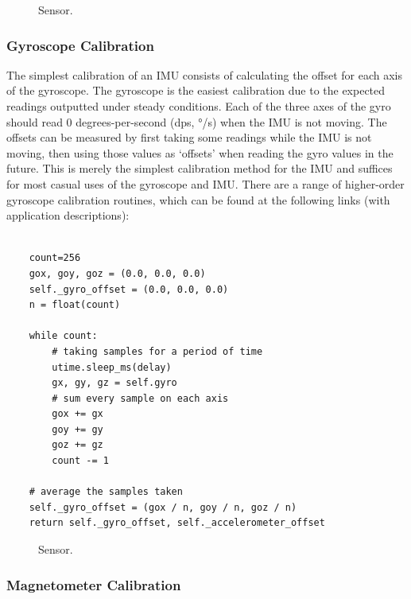 \begin{figure}[!h]
    \centering
    \resizebox{1\linewidth}{!}{}
    \caption{Sensor.}
\end{figure}

\subsubsection{Gyroscope Calibration}

The simplest calibration of an IMU consists of calculating the offset for each axis of the gyroscope. The gyroscope is the easiest calibration due to the expected readings outputted under steady conditions. Each of the three axes of the gyro should read 0 degrees-per-second (dps, °/s) when the IMU is not moving. The offsets can be measured by first taking some readings while the IMU is not moving, then using those values as ‘offsets’ when reading the gyro values in the future. This is merely the simplest calibration method for the IMU and suffices for most casual uses of the gyroscope and IMU. There are a range of  higher-order gyroscope calibration routines, which can be found at the following links (with application descriptions):

\lstset{language=Python}

\begin{lstlisting}[frame=single]  % Start your code-block

    count=256
    gox, goy, goz = (0.0, 0.0, 0.0)
    self._gyro_offset = (0.0, 0.0, 0.0) 
    n = float(count)

    while count:
        # taking samples for a period of time
        utime.sleep_ms(delay)
        gx, gy, gz = self.gyro
        # sum every sample on each axis
        gox += gx
        goy += gy
        goz += gz
        count -= 1

    # average the samples taken
    self._gyro_offset = (gox / n, goy / n, goz / n)
    return self._gyro_offset, self._accelerometer_offset
\end{lstlisting}

\begin{figure}[!h]
    \centering
    \resizebox{1\linewidth}{!}{}
    \caption{Sensor.}
\end{figure}

\subsubsection{Magnetometer Calibration}

